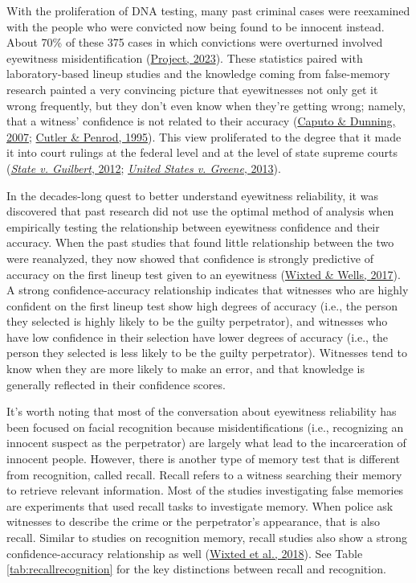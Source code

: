 \documentclass[
]{krantz}
\begin{document}
With the proliferation of DNA testing, many past criminal cases were reexamined with the people who were convicted now being found to be innocent instead. About 70\% of these 375 cases in which convictions were overturned involved eyewitness misidentification (\protect\hyperlink{ref-innocenceproject}{Project, 2023}). These statistics paired with laboratory-based lineup studies and the knowledge coming from false-memory research painted a very convincing picture that eyewitnesses not only get it wrong frequently, but they don't even know when they're getting wrong; namely, that a witness' confidence is not related to their accuracy (\protect\hyperlink{ref-caputo2007distinguishing}{Caputo \& Dunning, 2007}; \protect\hyperlink{ref-cutler1995mistaken}{Cutler \& Penrod, 1995}). This view proliferated to the degree that it made it into court rulings at the federal level and at the level of state supreme courts (\protect\hyperlink{ref-statevguilbert}{\emph{State v. Guilbert}, 2012}; \protect\hyperlink{ref-unitedstatesvgreene}{\emph{United States v. Greene}, 2013}).

In the decades-long quest to better understand eyewitness reliability, it was discovered that past research did not use the optimal method of analysis when empirically testing the relationship between eyewitness confidence and their accuracy. When the past studies that found little relationship between the two were reanalyzed, they now showed that confidence is strongly predictive of accuracy on the first lineup test given to an eyewitness (\protect\hyperlink{ref-wixted2017relationship}{Wixted \& Wells, 2017}). A strong confidence-accuracy relationship indicates that witnesses who are highly confident on the first lineup test show high degrees of accuracy (i.e., the person they selected is highly likely to be the guilty perpetrator), and witnesses who have low confidence in their selection have lower degrees of accuracy (i.e., the person they selected is less likely to be the guilty perpetrator). Witnesses tend to know when they are more likely to make an error, and that knowledge is generally reflected in their confidence scores.

It's worth noting that most of the conversation about eyewitness reliability has been focused on facial recognition because misidentifications (i.e., recognizing an innocent suspect as the perpetrator) are largely what lead to the incarceration of innocent people. However, there is another type of memory test that is different from recognition, called recall. Recall refers to a witness searching their memory to retrieve relevant information. Most of the studies investigating false memories are experiments that used recall tasks to investigate memory. When police ask witnesses to describe the crime or the perpetrator's appearance, that is also recall. Similar to studies on recognition memory, recall studies also show a strong confidence-accuracy relationship as well (\protect\hyperlink{ref-wixted2018rethinking}{Wixted et al., 2018}). See Table \ref{tab:recallrecognition} for the key distinctions between recall and recognition.
\end{document}
